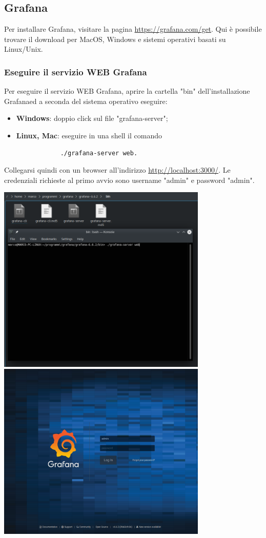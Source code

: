 \subsection{Grafana}
Per installare Grafana\glo, visitare la pagina \url{https://grafana.com/get}. Qui è possibile trovare il download per MacOS, Windows e sistemi operativi basati su Linux/Unix.
\subsubsection{Eseguire il servizio WEB Grafana} Per eseguire il servizio WEB Grafana\glo, aprire la cartella "bin" dell'installazione Grafana\glosp ed a seconda del sistema operativo eseguire:
\begin{itemize}
	\item \textbf{Windows}: doppio click sul file "grafana-server";
	\item \textbf{Linux, Mac}: eseguire in una shell il comando
		\begin{verbatim}
			./grafana-server web.
		\end{verbatim}
\end{itemize}
Collegarsi quindi con un browser all'indirizzo \url{http://localhost:3000/}. Le credenziali richieste al primo avvio sono username "admin" e password "admin".
\begin{center}
\includegraphics[width=10cm,height=\textheight,keepaspectratio]{img/grafana-server.png}
\mbox{}\\ [5mm]
\includegraphics[width=10cm,height=\textheight,keepaspectratio]{img/grafana-login.png}
\end{center}

